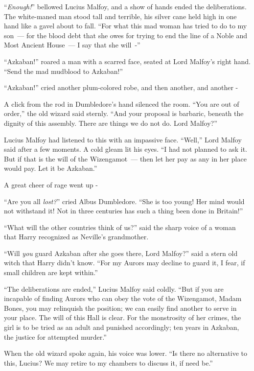 ``\emph{Enough!}'' bellowed Lucius Malfoy, and a show of hands ended the deliberations. The white-maned man stood tall and terrible, his silver cane held high in one hand like a gavel about to fall. ``For what this mad woman has tried to do to my son~--- for the blood debt that she owes for trying to end the line of a Noble and Most Ancient House~--- I say that she will~-''

``Azkaban!'' roared a man with a scarred face, seated at Lord Malfoy's right hand. ``Send the mad mudblood to Azkaban!''

``Azkaban!'' cried another plum-colored robe, and then another, and another -

A click from the rod in Dumbledore's hand silenced the room. ``You are out of order,'' the old wizard said sternly. ``And your proposal is barbaric, beneath the dignity of this assembly. There are things we do not do. Lord Malfoy?''

Lucius Malfoy had listened to this with an impassive face. ``Well,'' Lord Malfoy said after a few moments. A cold gleam lit his eyes. ``I had not planned to ask it. But if that is the will of the Wizengamot~--- then let her pay as any in her place would pay. Let it be Azkaban.''

A great cheer of rage went up -

``Are you all \emph{lost?}'' cried Albus Dumbledore. ``She is too young! Her mind would not withstand it! Not in three centuries has such a thing been done in Britain!''

``What will the other countries think of us?'' said the sharp voice of a woman that Harry recognized as Neville's grandmother.

``Will \emph{you} guard Azkaban after she goes there, Lord Malfoy?'' said a stern old witch that Harry didn't know. ``For my Aurors may decline to guard it, I fear, if small children are kept within.''

``The deliberations are ended,'' Lucius Malfoy said coldly. ``But if you are incapable of finding Aurors who can obey the vote of the Wizengamot, Madam Bones, you may relinquish the position; we can easily find another to serve in your place. The will of this Hall is clear. For the monstrosity of her crimes, the girl is to be tried as an adult and punished accordingly; ten years in Azkaban, the justice for attempted murder.''

When the old wizard spoke again, his voice was lower. ``Is there no alternative to this, Lucius? We may retire to my chambers to discuss it, if need be.''

